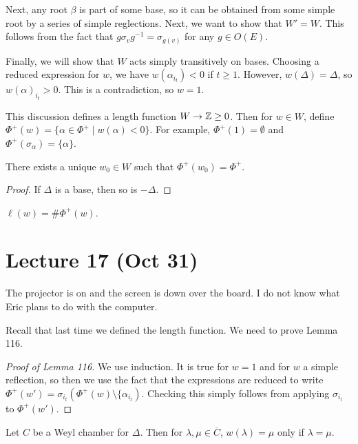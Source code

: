 \documentclass[twoside, 10pt]{article}
\begin{document}
    Next, any root $\beta$ is part of some base, so it can be obtained from
    some simple root by a series of simple reglections. Next, we want to show
    that $W' = W$. This follows from the fact that $g \sigma_v g^{-1} =
    \sigma_{g(v)}$ for any $g \in O(E)$.

    Finally, we will show that $W$ acts simply transitively on bases. Choosing
    a reduced expression for $w$, we have $w(\alpha_{i_t}) < 0$ if $t \geq 1$.
    However, $w(\Delta) = \Delta$, so $w(\alpha)_{i_t} > 0$. This is a
    contradiction, so $w = 1$.

    This discussion defines a length function $W \to \mathbb{Z} \geq 0$. Then for $w
    \in W$, define $\Phi^+(w) = \{ \alpha \in \Phi^+ \mid w(\alpha) < 0 \}$.
    For example, $\Phi^+(1) = \emptyset$ and $\Phi^+(\sigma_{\alpha}) =
    \{\alpha\}$.

    \begin{prop} There exists a unique $w_0 \in W$ such that $\Phi^+(w_0) =
    \Phi^+$.  \end{prop}

    \begin{proof} If $\Delta$ is a base, then so is $-\Delta$.  \end{proof}

    \begin{lem} $\ell(w) = \# \Phi^+(w)$.  \end{lem}

     \section{Lecture 17 (Oct 31)}%

    The projector is on and the screen is down over the board. I do not know
    what Eric plans to do with the computer.

    Recall that last time we defined the length function. We need to prove
    Lemma 116.  \begin{proof}[Proof of Lemma 116] We use induction. It is true
        for $w=1$ and for $w$ a simple reflection, so then we use the fact that
        the expressions are reduced to write $\Phi^+(w') =
        \sigma_{i_t}(\Phi^+(w) \setminus \{\alpha_{i_t})$. Checking this simply
            follows from applying $\sigma_{i_t}$ to $\Phi^+(w')$.  \end{proof}

    \begin{lem} Let $C$ be a Weyl chamber for $\Delta$. Then for $\lambda, \mu
    \in \overline{C}$, $w(\lambda) = \mu$ only if $\lambda = \mu$.  \end{lem}
\end{document}
